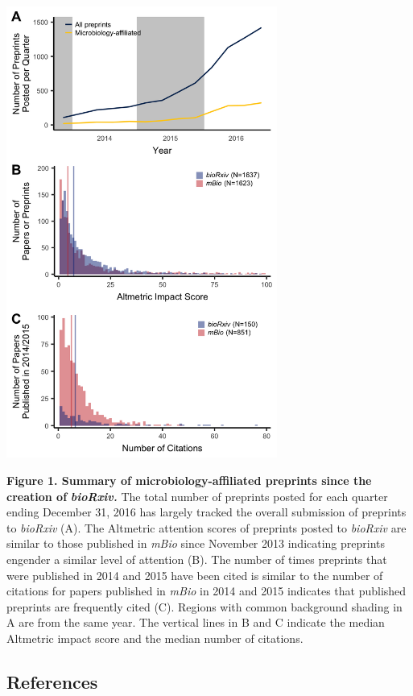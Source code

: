 \documentclass[11pt,]{article}
\begin{document}
\newpage

\includegraphics[width=3.5in]{../figures/figure1.png}

\textbf{Figure 1. Summary of microbiology-affiliated preprints since the
creation of} \textbf{\emph{bioRxiv.}} The total number of preprints
posted for each quarter ending December 31, 2016 has largely tracked the
overall submission of preprints to \emph{bioRxiv} (A). The Altmetric
attention scores of preprints posted to \emph{bioRxiv} are similar to
those published in \emph{mBio} since November 2013 indicating preprints
engender a similar level of attention (B). The number of times preprints
that were published in 2014 and 2015 have been cited is similar to the
number of citations for papers published in \emph{mBio} in 2014 and 2015
indicates that published preprints are frequently cited (C). Regions
with common background shading in A are from the same year. The vertical
lines in B and C indicate the median Altmetric impact score and the
median number of citations.

\newpage

\subsection*{References}\label{references}
\end{document}
